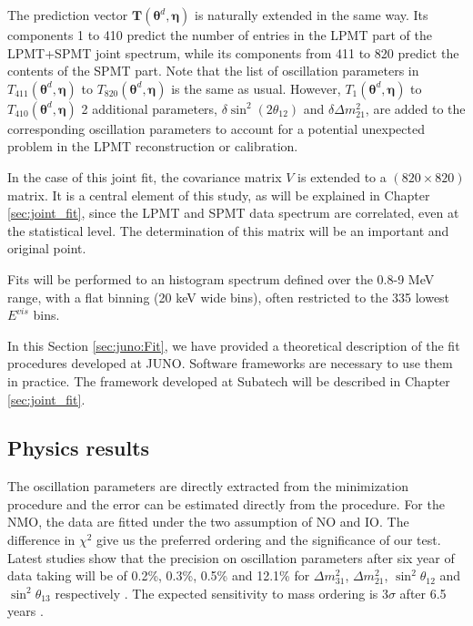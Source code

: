 \documentclass[../main.tex]{subfiles}
\begin{document}
The prediction vector $\bm{T}\left(\bm{\theta}^d,\bm{\eta}\right)$ is naturally extended in the same way. Its components 1 to 410 predict the number of entries in the LPMT part of the LPMT+SPMT joint spectrum, while its components from 411 to 820 predict the contents of the SPMT part. Note that the list of oscillation parameters in $T_{411}(\bm{\theta}^d,\bm{\eta})$ to $T_{820}(\bm{\theta}^d,\bm{\eta})$ is the same as usual. However, $T_1(\bm{\theta}^d,\bm{\eta})$ to $T_{410}(\bm{\theta}^d,\bm{\eta})$ 2 additional parameters, $\delta \sin^2(2\theta_{12})$ and $\delta \Delta m^2_{21}$, are added to the corresponding oscillation parameters to account for a potential unexpected problem in the LPMT reconstruction or calibration.

In the case of this joint fit, the covariance matrix $V$ is extended to a $(820 \times 820)$ matrix. It is a central element of this study, as will be explained in Chapter \ref{sec:joint_fit}, since the LPMT and SPMT data spectrum are correlated, even at the statistical level. The determination of this matrix will be an important and original point.

Fits will be performed to an histogram spectrum defined over the 0.8-9 MeV range, with a flat binning (20 keV wide bins), often restricted to the 335 lowest $E^{vis}$ bins.

In this Section \ref{sec:juno:Fit}, we have provided a theoretical description of the fit procedures developed at JUNO. Software frameworks are necessary to use them in practice. The framework developed at Subatech will be described in Chapter \ref{sec:joint_fit}.

\subsection{Physics results}

The oscillation parameters are directly extracted from the minimization procedure and the error can be estimated directly from the procedure. For the NMO, the data are fitted under the two assumption of NO and IO. The difference in $\chi^2$ give us the preferred ordering and the significance of our test. Latest studies show that the precision on oscillation parameters after six year of data taking will be of 0.2\%, 0.3\%, 0.5\% and 12.1\% for $\Delta m^2_{31}$, $\Delta m^2_{21}$, $\sin^2\theta_{12}$ and $\sin^2\theta_{13}$ respectively \cite{juno_collaboration_sub-percent_2022}. The expected sensitivity to mass ordering is $3\sigma$ after 6.5 years \cite{juno_collaboration_juno_2022}.
\end{document}
